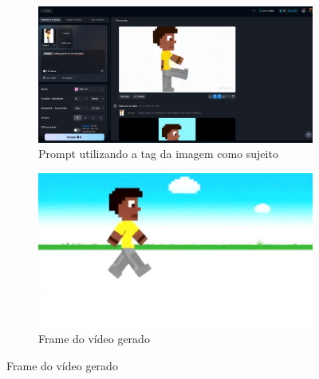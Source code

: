 \begin{figure}[htbp]
    \centering
    \caption{\small Processo da utilização 3 do Vidu em julho/2025}
    \label{fig:vidu4}
    \begin{subfigure}{0.6\linewidth}
        \includegraphics[width=1\linewidth]{figs/vidu/tela5.PNG}
        \caption{\small Prompt utilizando a tag da imagem como sujeito}
        \label{fig:vidu4a}
    \end{subfigure}
    \begin{subfigure}{0.35\linewidth}
        \includegraphics[width=1\linewidth]{figs/vidu/frame6.jpg}
        \caption{\small Frame do vídeo gerado}
        \label{fig:vidu4b}
    \end{subfigure}
\end{figure}

